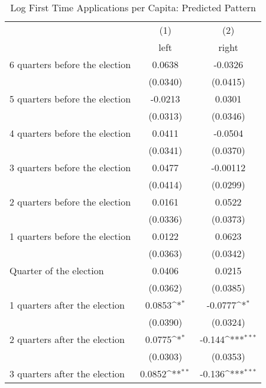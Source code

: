 \begin{table}[htbp]\centering
\def\sym#1{\ifmmode^{#1}\else\(^{#1}\)\fi}
\caption{Log First Time Applications per Capita: Predicted Pattern}
\begin{tabular}{l*{2}{c}}
\hline\hline
                    &\multicolumn{1}{c}{(1)}&\multicolumn{1}{c}{(2)}\\
                    &\multicolumn{1}{c}{left}&\multicolumn{1}{c}{right}\\
\hline
 6 quarters before the election&      0.0638         &     -0.0326         \\
                    &    (0.0340)         &    (0.0415)         \\
[1em]
 5 quarters before the election&     -0.0213         &      0.0301         \\
                    &    (0.0313)         &    (0.0346)         \\
[1em]
 4 quarters before the election&      0.0411         &     -0.0504         \\
                    &    (0.0341)         &    (0.0370)         \\
[1em]
 3 quarters before the election&      0.0477         &    -0.00112         \\
                    &    (0.0414)         &    (0.0299)         \\
[1em]
 2 quarters before the election&      0.0161         &      0.0522         \\
                    &    (0.0336)         &    (0.0373)         \\
[1em]
 1 quarters before the election&      0.0122         &      0.0623         \\
                    &    (0.0363)         &    (0.0342)         \\
[1em]
Quarter of the election&      0.0406         &      0.0215         \\
                    &    (0.0362)         &    (0.0385)         \\
[1em]
 1 quarters after the election&      0.0853\sym{*}  &     -0.0777\sym{*}  \\
                    &    (0.0390)         &    (0.0324)         \\
[1em]
 2 quarters after the election&      0.0775\sym{*}  &      -0.144\sym{***}\\
                    &    (0.0303)         &    (0.0353)         \\
[1em]
 3 quarters after the election&      0.0852\sym{**} &      -0.136\sym{***}\\

\end{tabular}
\end{table}

